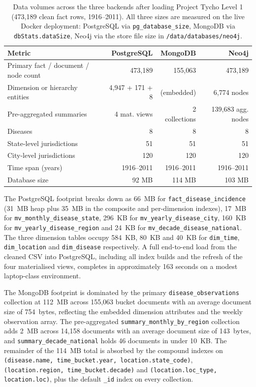 \documentclass[12pt,a4paper]{article}
\begin{document}
\begin{table}[H]
\centering
\caption{Data volumes across the three backends after loading Project Tycho Level 1 (473{,}189 clean fact rows, 1916--2011). All three sizes are measured on the live Docker deployment: PostgreSQL via \texttt{pg\_database\_size}, MongoDB via \texttt{dbStats.dataSize}, Neo4j via the store file size in \texttt{/data/databases/neo4j}.}
\label{tab:data_volumes}
\begin{tabular}{lrrr}
\toprule
\textbf{Metric} & \textbf{PostgreSQL} & \textbf{MongoDB} & \textbf{Neo4j} \\
\midrule
Primary fact / document / node count & 473{,}189 & 155{,}063 & 473{,}189 \\
Dimension or hierarchy entities & 4{,}947 + 171 + 8 & (embedded) & 6{,}774 nodes \\
Pre-aggregated summaries & 4 mat. views & 2 collections & 139{,}683 agg. nodes \\
Diseases & 8 & 8 & 8 \\
State-level jurisdictions & 51 & 51 & 51 \\
City-level jurisdictions & 120 & 120 & 120 \\
Time span (years) & 1916--2011 & 1916--2011 & 1916--2011 \\
Database size & 92 MB & 114 MB & 103 MB \\
\bottomrule
\end{tabular}
\end{table}

The PostgreSQL footprint breaks down as 66~MB for \texttt{fact\_disease\_incidence} (31~MB heap plus 35~MB in the composite and per-dimension indexes), 17~MB for \texttt{mv\_monthly\_disease\_state}, 296~KB for \texttt{mv\_yearly\_disease\_city}, 160~KB for \texttt{mv\_yearly\_disease\_region} and 24~KB for \texttt{mv\_decade\_disease\_national}. The three dimension tables occupy 584~KB, 80~KB and 40~KB for \texttt{dim\_time}, \texttt{dim\_location} and \texttt{dim\_disease} respectively. A full end-to-end load from the cleaned CSV into PostgreSQL, including all index builds and the refresh of the four materialised views, completes in approximately 163 seconds on a modest laptop-class environment.

The MongoDB footprint is dominated by the primary \texttt{disease\_observations} collection at 112~MB across 155{,}063 bucket documents with an average document size of 754~bytes, reflecting the embedded dimension attributes and the weekly observation array. The pre-aggregated \texttt{summary\_monthly\_by\_region} collection adds 2~MB across 14{,}158 documents with an average document size of 143~bytes, and \texttt{summary\_decade\_national} holds 46 documents in under 10~KB. The remainder of the 114~MB total is absorbed by the compound indexes on \texttt{(disease.name, time\_bucket.year, location.state\_code)}, \texttt{(location.region, time\_bucket.decade)} and \texttt{(location.loc\_type, location.loc)}, plus the default \texttt{\_id} index on every collection.
\end{document}
